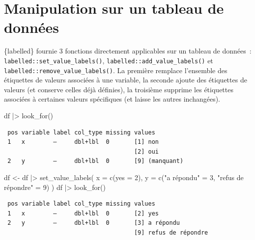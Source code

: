 \documentclass[
  letterpaper,
  DIV=11,
  numbers=noendperiod,
  oneside]{scrreprt}
\newenvironment{Shaded}{\begin{snugshade}}{\end{snugshade}}
\newcommand{\AttributeTok}[1]{\textcolor[rgb]{0.40,0.45,0.13}{#1}}
\newcommand{\DecValTok}[1]{\textcolor[rgb]{0.68,0.00,0.00}{#1}}
\newcommand{\FunctionTok}[1]{\textcolor[rgb]{0.28,0.35,0.67}{#1}}
\newcommand{\NormalTok}[1]{\textcolor[rgb]{0.00,0.23,0.31}{#1}}
\newcommand{\OtherTok}[1]{\textcolor[rgb]{0.00,0.23,0.31}{#1}}
\newcommand{\SpecialCharTok}[1]{\textcolor[rgb]{0.37,0.37,0.37}{#1}}
\newcommand{\StringTok}[1]{\textcolor[rgb]{0.13,0.47,0.30}{#1}}
\begin{document}
\hypertarget{manipulation-sur-un-tableau-de-donnuxe9es-1}{%
\section{Manipulation sur un tableau de
données}\label{manipulation-sur-un-tableau-de-donnuxe9es-1}}

\{labelled\} fournie 3 fonctions directement applicables sur un tableau
de données~: \texttt{labelled::set\_value\_labels()},
\texttt{labelled::add\_value\_labels()} et
\texttt{labelled::remove\_value\_labels()}. La première remplace
l'ensemble des étiquettes de valeurs associées à une variable, la
seconde ajoute des étiquettes de valeurs (et conserve celles déjà
définies), la troisième supprime les étiquettes associées à certaines
valeurs spécifiques (et laisse les autres inchangées).

\begin{Shaded}
\begin{Highlighting}[]
\NormalTok{df }\SpecialCharTok{|\textgreater{}} 
  \FunctionTok{look\_for}\NormalTok{()}
\end{Highlighting}
\end{Shaded}

\begin{verbatim}
 pos variable label col_type missing values        
 1   x        —     dbl+lbl  0       [1] non       
                                     [2] oui       
 2   y        —     dbl+lbl  0       [9] (manquant)
\end{verbatim}

\begin{Shaded}
\begin{Highlighting}[]
\NormalTok{df }\OtherTok{\textless{}{-}}\NormalTok{ df }\SpecialCharTok{|\textgreater{}} 
  \FunctionTok{set\_value\_labels}\NormalTok{(}
    \AttributeTok{x =} \FunctionTok{c}\NormalTok{(}\AttributeTok{yes =} \DecValTok{2}\NormalTok{),}
    \AttributeTok{y =} \FunctionTok{c}\NormalTok{(}\StringTok{"a répondu"} \OtherTok{=} \DecValTok{3}\NormalTok{, }\StringTok{"refus de répondre"} \OtherTok{=} \DecValTok{9}\NormalTok{)}
\NormalTok{  )}
\NormalTok{df }\SpecialCharTok{|\textgreater{}} 
  \FunctionTok{look\_for}\NormalTok{()}
\end{Highlighting}
\end{Shaded}

\begin{verbatim}
 pos variable label col_type missing values               
 1   x        —     dbl+lbl  0       [2] yes              
 2   y        —     dbl+lbl  0       [3] a répondu        
                                     [9] refus de répondre
\end{verbatim}
\end{document}

